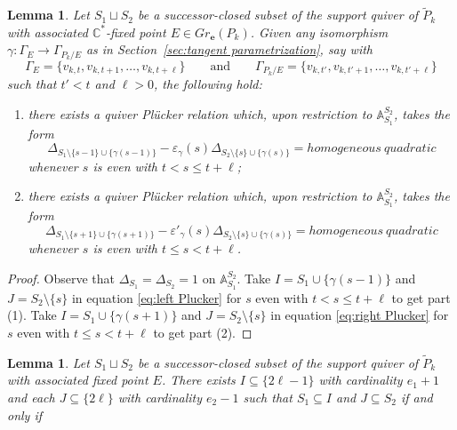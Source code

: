 \documentclass{amsart}
\newtheorem{lemma}[theorem]{Lemma}
\numberwithin{equation}{section}
\renewcommand{\AA}{\mathbb{A}}
\newcommand{\CC}{\mathbb{C}}
\newcommand{\bfe}{\mathbf{e}}
\begin{document}
  \begin{lemma}
    Let $S_1\sqcup S_2$ be a successor-closed subset of the support quiver of $\tilde P_k$ with associated $\CC^*$-fixed point $E\in Gr_\bfe(P_k)$.
    Given any isomorphism $\gamma:\Gamma_E\to\Gamma_{P_k/E}$ as in Section~\ref{sec:tangent parametrization}, say with
    \[\Gamma_E=\{v_{k,t},v_{k,t+1},\ldots,v_{k,t+\ell}\}\qquad\text{and}\qquad\Gamma_{P_k/E}=\{v_{k,t'},v_{k,t'+1},\ldots,v_{k,t'+\ell}\}\]
    such that $t'<t$ and $\ell>0$, the following hold:
    \begin{enumerate}
      \item there exists a quiver Pl\"ucker relation which, upon restriction to $\AA_{S_1}^{S_2}$, takes the form
        \[\Delta_{S_1\setminus\{s-1\}\cup\{\gamma(s-1)\}}-\varepsilon_\gamma(s)\Delta_{S_2\setminus\{s\}\cup\{\gamma(s)\}}=homogeneous~quadratic\]
        whenever $s$ is even with $t<s\le t+\ell$;
      \item there exists a quiver Pl\"ucker relation which, upon restriction to $\AA_{S_1}^{S_2}$, takes the form
        \[\Delta_{S_1\setminus\{s+1\}\cup\{\gamma(s+1)\}}-\varepsilon'_\gamma(s)\Delta_{S_2\setminus\{s\}\cup\{\gamma(s)\}}=homogeneous~quadratic\]
        whenever $s$ is even with $t\le s<t+\ell$.
    \end{enumerate}
  \end{lemma}
  \begin{proof}
    Observe that $\Delta_{S_1}=\Delta_{S_2}=1$ on $\AA_{S_1}^{S_2}$.
    Take $I=S_1\cup\{\gamma(s-1)\}$ and $J=S_2\setminus\{s\}$ in equation \eqref{eq:left Plucker} for $s$ even with $t<s\le t+\ell$ to get part (1).
    Take $I=S_1\cup\{\gamma(s+1)\}$ and $J=S_2\setminus\{s\}$ in equation \eqref{eq:right Plucker} for $s$ even with $t\le s<t+\ell$ to get part (2).
  \end{proof}

  \begin{lemma}
    Let $S_1\sqcup S_2$ be a successor-closed subset of the support quiver of $\tilde P_k$ with associated fixed point $E$.
    There exists $I\subseteq\{2\ell-1\}$ with cardinality $e_1+1$ and each $J\subseteq\{2\ell\}$ with cardinality $e_2-1$ such that $S_1\subseteq I$ and $J\subseteq S_2$ if and only if 
  \end{lemma}
  
\end{document}

